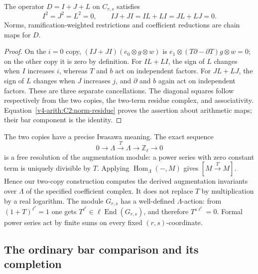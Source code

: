 \begin{proposition}
\label{v4-arith:pos-costello:lem:mixed-1}
\label{v4-arith:pos-costello:lem:mixed-2}
\label{v4-arith:pos-costello:lem:mixed-3}
The operator \(D=I+J+L\) on \(C_{r,s}\) satisfies
\[
 I^2=J^2=L^2=0,\qquad IJ+JI=IL+LI=JL+LJ=0.
\]
Norms, ramification-weighted restrictions and coefficient reductions
are chain maps for \(D\).
\end{proposition}

\begin{proof}
On the \(i=0\) copy, \((IJ+JI)(e_0\otimes g\otimes w)\) is
\(e_1\otimes(T\partial-\partial T)g\otimes w=0\);
on the other copy it is zero by definition. For \(IL+LI\), the
sign of \(L\) changes when \(I\) increases \(i\), whereas \(T\)
and \(b\) act on independent factors. For \(JL+LJ\), the sign of
\(L\) changes when \(J\) increases \(j\), and \(\partial\) and
\(b\) again act on independent factors. These are three separate
cancellations. The diagonal squares follow respectively from the
two copies, the two-term residue complex, and associativity.
Equation~\eqref{v4-arith:C2:norm-residue} proves the assertion
about arithmetic maps; their bar component is the identity.
\end{proof}

The two copies have a precise Iwasawa meaning. The exact sequence
\[
 0\longrightarrow\Lambda\xrightarrow{T}\Lambda
 \longrightarrow\mathbb Z_\ell\longrightarrow0
\]
is a free resolution of the augmentation module: a power series
with zero constant term is uniquely divisible by \(T\).
Applying \(\operatorname{Hom}_\Lambda(-,M)\) gives
\([M\xrightarrow{T}M]\). Hence our two-copy construction computes
the derived augmentation invariants over \(\Lambda\) of the
specified coefficient complex. It does not replace \(T\) by
multiplication by a real logarithm. The module \(G_{r,s}\) has a
well-defined \(\Lambda\)-action: from \((1+T)^{\ell^r}=1\) one
gets \(T^{\ell^r}\in\ell\operatorname{End}(G_{r,s})\), and therefore
\(T^{s\ell^r}=0\). Formal power series act by finite sums on every
fixed \((r,s)\)-coordinate.

\subsection{The ordinary bar comparison and its completion}

